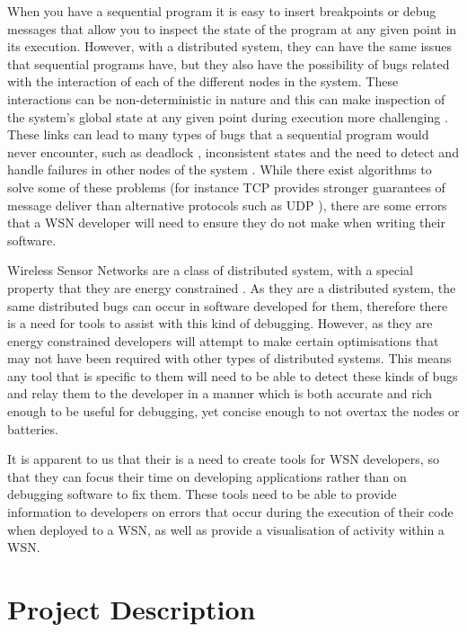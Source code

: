 \documentclass[a4paper]{article}
\begin{document}
When you have a sequential program it is easy to insert breakpoints or debug
messages that allow you to inspect the state of the program at any given point
in its execution. However, with a distributed system, they can have the same
issues that sequential programs have, but they also have the possibility of
bugs related with the interaction of each of the different nodes in the system.
These interactions can be non-deterministic \cite{liu2007wids} in nature and
this can make inspection of the system's global state at any given point during
execution more challenging \cite{chandy1985distributed}. These links can lead to
many types of bugs that a sequential program would never encounter, such as
deadlock \cite{singhal1989deadlock}, inconsistent states
\cite{chandy1985distributed} and the need to detect and handle failures in other
nodes of the system \cite{5623434}. While there exist algorithms to solve some
of these problems (for instance TCP provides stronger guarantees of message
deliver than alternative protocols such as UDP
\cite[p.~532]{Tanenbaum:2002:CN:572404}), there are some errors that a WSN
developer will need to ensure they do not make when writing their software.

Wireless Sensor Networks are a class of distributed system, with a special
property that they are energy constrained \cite{6023235}. As they are a
distributed system, the same distributed bugs can occur in software developed
for them, therefore there is a need for tools to assist with this kind of
debugging. However, as they are energy constrained developers will attempt to
make certain optimisations that may not have been required with other types of
distributed systems. This means any tool that is specific to them will need to
be able to detect these kinds of bugs and relay them to the developer in a
manner which is both accurate and rich enough to be useful for debugging, yet 
concise enough to not overtax the nodes or batteries.

It is apparent to us that their is a need to create tools for WSN developers,
so that they can focus their time on developing applications rather than on
debugging software to fix them. These tools need to be able to provide
information to developers on errors that occur during the execution of their code 
when deployed to a WSN, as well as provide a visualisation of activity within a WSN.

\section{Project Description}
\end{document}
